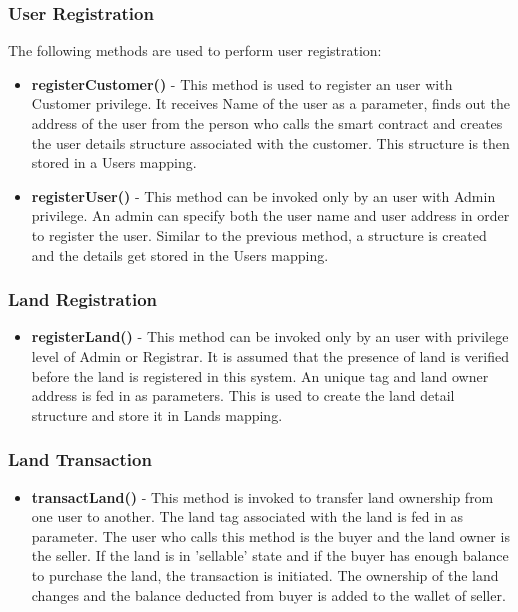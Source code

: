 \documentclass[11pt]{article}
\begin{document}
\subsubsection{\textbf{User Registration}}
\label{sec:orge64e160}
The following methods are used to perform user registration:
\begin{itemize}
\item \textbf{registerCustomer()} - This method is used to register an user with Customer privilege. It receives Name of the user as a parameter, finds out the address of the user from the person who calls the smart contract and creates the user details structure associated with the customer. This structure is then stored in a Users mapping.
\item \textbf{registerUser()} - This method can be invoked only by an user with Admin privilege. An admin can specify both the user name and user address in order to register the user. Similar to the previous method, a structure is created and the details get stored in the Users mapping.
\end{itemize}
\subsubsection{\textbf{Land Registration}}
\label{sec:org1b0406c}
\begin{itemize}
\item \textbf{registerLand()} - This method can be invoked only by an user with privilege level of Admin or Registrar. It is assumed that the presence of land is verified before the land is registered in this system. An unique tag and land owner address is fed in as parameters. This is used to create the land detail structure and store it in Lands mapping.
\end{itemize}
\subsubsection{\textbf{Land Transaction}}
\label{sec:org673e852}
\begin{itemize}
\item \textbf{transactLand()} - This method is invoked to transfer land ownership from one user to another. The land tag associated with the land is fed in as parameter. The user who calls this method is the buyer and the land owner is the seller. If the land is in 'sellable' state and if the buyer has enough balance to purchase the land, the transaction is initiated. The ownership of the land changes and the balance deducted from buyer is added to the wallet of seller.
\end{itemize}
\end{document}
